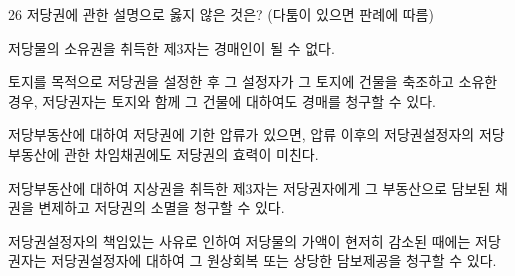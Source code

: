 \begin{question}{26}
저당권에 관한 설명으로 옳지 않은 것은? (다툼이 있으면 판례에 따름)
\begin{choices}
  \item 저당물의 소유권을 취득한 제3자는 경매인이 될 수 없다.
  \item 토지를 목적으로 저당권을 설정한 후 그 설정자가 그 토지에 건물을 축조하고 소유한 경우, 저당권자는 토지와 함께 그 건물에 대하여도 경매를 청구할 수 있다.
  \item 저당부동산에 대하여 저당권에 기한 압류가 있으면, 압류 이후의 저당권설정자의 저당부동산에 관한 차임채권에도 저당권의 효력이 미친다.
  \item 저당부동산에 대하여 지상권을 취득한 제3자는 저당권자에게 그 부동산으로 담보된 채권을 변제하고 저당권의 소멸을 청구할 수 있다.
  \item 저당권설정자의 책임있는 사유로 인하여 저당물의 가액이 현저히 감소된 때에는 저당권자는 저당권설정자에 대하여 그 원상회복 또는 상당한 담보제공을 청구할 수 있다.
\end{choices}
\end{question}
